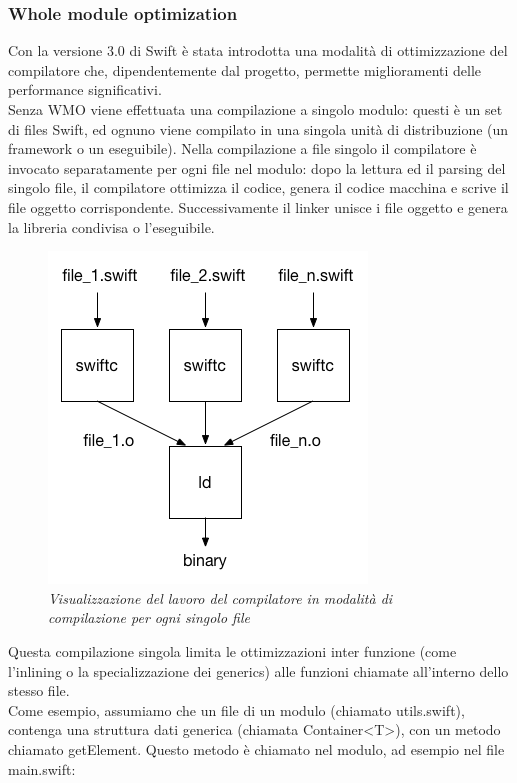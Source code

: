 \subsubsection{Whole module optimization}
Con la versione 3.0 di Swift è stata introdotta una modalità di ottimizzazione del compilatore che, dipendentemente dal progetto, permette miglioramenti delle performance significativi.\\
Senza WMO viene effettuata una compilazione a singolo modulo:
questi è un set di files Swift, ed ognuno viene compilato in una singola unità di distribuzione (un framework o un eseguibile). Nella compilazione a file singolo il compilatore è invocato separatamente per ogni file nel modulo: dopo la lettura ed il parsing del singolo file, il compilatore ottimizza il codice, genera il codice macchina e scrive il file oggetto corrispondente. Successivamente il linker unisce i file oggetto e genera la libreria condivisa o l'eseguibile.
\begin{figure}[H]
      \centering
      \includegraphics[scale=0.80]{immagini/single-file.png}
            \vspace{0.8cm}
            \caption{\textit{Visualizzazione del lavoro del compilatore in modalità di compilazione per ogni singolo file}}
\end{figure}
Questa compilazione singola limita le ottimizzazioni inter funzione (come l'inlining o la specializzazione dei generics) alle funzioni chiamate all'interno dello stesso file.\\Come esempio, assumiamo che un file di un modulo  (chiamato utils.swift), contenga una struttura dati generica (chiamata Container<T>), con un metodo chiamato getElement. Questo metodo è chiamato nel modulo, ad esempio nel file main.swift:
